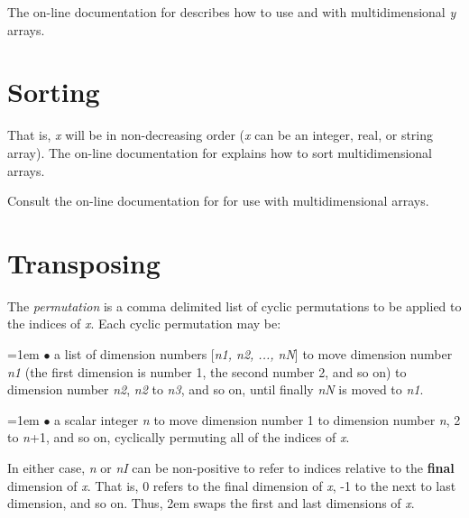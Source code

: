 The on-line  documentation for  describes how to
use  and  with multidimensional {\it y} arrays.

\section{Sorting}


That is, {\it x\/} will be in non-decreasing order
({\it x\/} can be an integer, real, or string array).  The on-line
 documentation for  explains how to sort
multidimensional arrays.


Consult the on-line  documentation for  for use
with multidimensional arrays.

\section{Transposing}


The {\it permutation\/} is a comma delimited list of cyclic permutations
to be applied to the indices of {\it x}.  Each cyclic permutation may
be:

\hangindent=1em
$\bullet$ a list of dimension numbers [{\it n1, n2, ..., nN\/}] \hfil\break
to move dimension number {\it n1\/} (the first dimension is number 1, the
second number 2, and so on) to dimension number {\it n2\/}, {\it n2\/} to
{\it n3\/}, and so on, until finally {\it nN\/} is moved to {\it n1\/}.

\hangindent=1em
$\bullet$ a scalar integer {\it n} \hfil\break
to move dimension number 1 to dimension number {\it n\/}, 2 to {\it n\/}+1,
and so on, cyclically permuting all of the indices of {\it x}.

In either case, {\it n\/} or {\it nI\/} can be non-positive to refer to
indices relative to the {\bf final} dimension of {\it x}.  That is, 0 refers
to the final dimension of {\it x}, -1 to the next to last dimension, and so
on.  Thus, \hfil\break
\hglue2em  \hfil\break
swaps the first and last dimensions of {\it x}.


